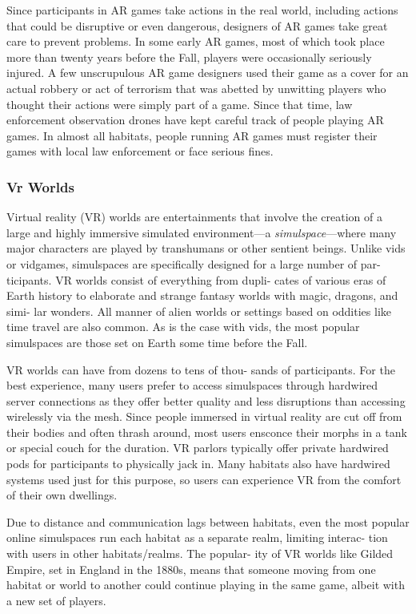 Since participants in AR games take actions in the 
real world, including actions that could be disruptive 
or even dangerous, designers of AR games take great 
care to prevent problems. In some early AR games, 
most of which took place more than twenty years 
before the Fall, players were occasionally seriously 
injured. A few unscrupulous AR game designers used 
their game as a cover for an actual robbery or act 
of terrorism that was abetted by unwitting players 
who thought their actions were simply part of a game. 
Since that time, law enforcement observation drones 
have kept careful track of people playing AR games. 
In almost all habitats, people running AR games must 
register their games with local law enforcement or 
face serious fines.

\subsubsection{Vr Worlds}

Virtual reality (VR) worlds are entertainments that 
involve the creation of a large and highly immersive 
simulated environment—a \textit{simulspace}—where many 
major characters are played by transhumans or other 
sentient beings. Unlike vids or vidgames, simulspaces 
are specifically designed for a large number of par-
ticipants. VR worlds consist of everything from dupli-
cates of various eras of Earth history to elaborate and 
strange fantasy worlds with magic, dragons, and simi-
lar wonders. All manner of alien worlds or settings 
based on oddities like time travel are also common. As 
is the case with vids, the most popular simulspaces are 
those set on Earth some time before the Fall.

VR worlds can have from dozens to tens of thou-
sands of participants. For the best experience, many 
users prefer to access simulspaces through hardwired 
server connections as they offer better quality and 
less disruptions than accessing wirelessly via the 
mesh. Since people immersed in virtual reality are cut 
off from their bodies and often thrash around, most 
users ensconce their morphs in a tank or special couch 
for the duration. VR parlors typically offer private 
hardwired pods for participants to physically jack in. 
Many habitats also have hardwired systems used just 
for this purpose, so users can experience VR from the 
comfort of their own dwellings.

Due to distance and communication lags between 
habitats, even the most popular online simulspaces 
run each habitat as a separate realm, limiting interac-
tion with users in other habitats/realms. The popular-
ity of VR worlds like Gilded Empire, set in England 
in the 1880s, means that someone moving from one 
habitat or world to another could continue playing in 
the same game, albeit with a new set of players.

